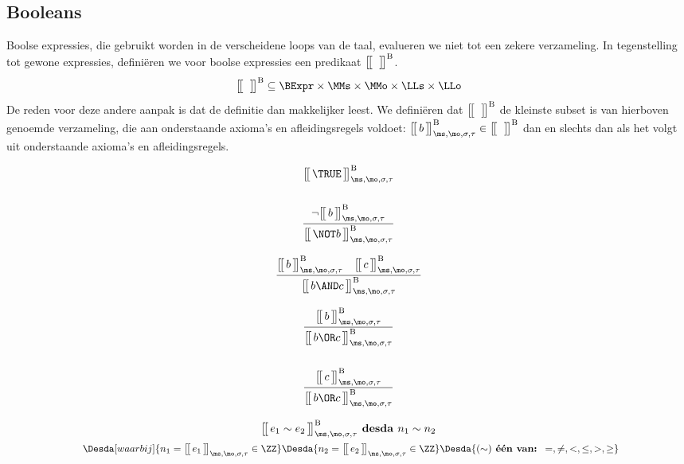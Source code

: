 \subsection{Booleans}

Boolse expressies, die gebruikt worden in de verscheidene loops van de taal, evalueren we niet tot een zekere verzameling. In tegenstelling tot gewone expressies, definiëren we voor boolse expressies een predikaat $\Express[B]{\;}{}$.
%
\begin{equation*}
  \Express[B]{\;}{} \subseteq \BExpr \times \MMs \times \MMo \times \LLs \times \LLo
\end{equation*}
%
De reden voor deze andere aanpak is dat de definitie dan makkelijker leest. We definiëren dat $\Express[B]{\;}{}$ de kleinste subset is van hierboven genoemde verzameling, die aan onderstaande axioma's en afleidingsregels voldoet: $\Express[B]{b}{\ms,\mo,\sigma,\tau} \in \Express[B]{\;}{}$ dan en slechts dan als het volgt uit onderstaande axioma's en afleidingsregels.

\begin{minipage}{.33\textwidth}
  \begin{gather*}
  \Express[B]{\TRUE}{\ms,\mo,\sigma,\tau} \\[15pt]
  \frac
    {\neg \Express[B]{b}{\ms,\mo,\sigma,\tau}}
    {\Express[B]{\NOT b}{\ms,\mo,\sigma,\tau}}
  \end{gather*}
\end{minipage}
\begin{minipage}{.33\textwidth}
  \begin{gather*}
  \frac
    {\Express[B]{b}{\ms,\mo,\sigma,\tau} \quad \Express[B]{c}{\ms,\mo,\sigma,\tau}}
    {\Express[B]{b \AND c}{\ms,\mo,\sigma,\tau}}
  \end{gather*}
\end{minipage}
\begin{minipage}{.33\textwidth}
  \begin{gather*}
  \frac
    {\Express[B]{b}{\ms,\mo,\sigma,\tau}}
    {\Express[B]{b \OR c}{\ms,\mo,\sigma,\tau}} \\[15pt]
  \frac
    {\Express[B]{c}{\ms,\mo,\sigma,\tau}}
    {\Express[B]{b \OR c}{\ms,\mo,\sigma,\tau}}
  \end{gather*}
\end{minipage}
\begin{gather*}
  \Express[B]{e_1 \sim e_2}{\ms,\mo,\sigma,\tau} \textbf{ desda } n_1 \sim n_2 \\
  \Desdas{
    \Desda[waarbij]{n_1 = \Express{e_1}{\ms,\mo,\sigma,\tau} \in \ZZ}
    \Desda{n_2 = \Express{e_2}{\ms,\mo,\sigma,\tau} \in \ZZ}
    \Desda{(\sim) \textbf{ één van: } =, \neq, <, \le, >, \ge}
  }
\end{gather*}


